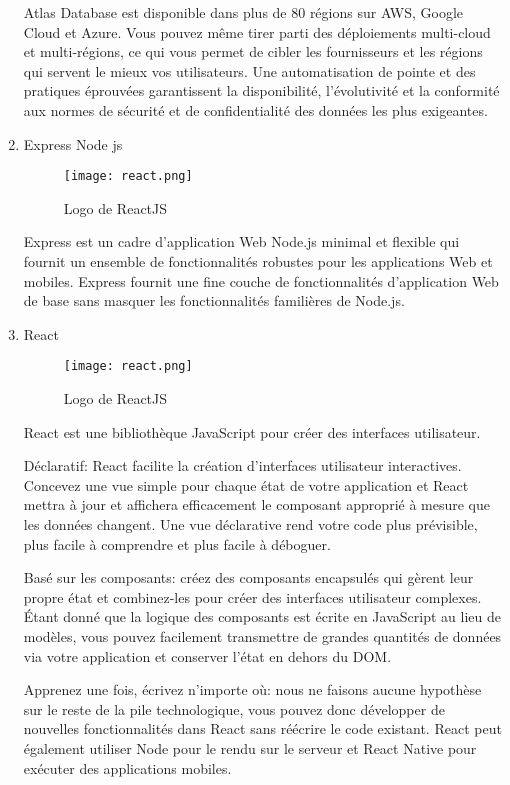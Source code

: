 \begin{enumerate}
        Atlas Database est disponible dans plus de 80 régions sur AWS, Google Cloud et Azure. Vous pouvez même tirer parti des déploiements multi-cloud et multi-régions, ce qui vous permet de cibler les fournisseurs et les régions qui servent le mieux vos utilisateurs. Une automatisation de pointe et des pratiques éprouvées garantissent la disponibilité, l'évolutivité et la conformité aux normes de sécurité et de confidentialité des données les plus exigeantes.
        \bfseries
        \item Express Node js\newline
        \begin{figure}[H]
            \centering
            \texttt{[image: react.png]}
            \caption{Logo de ReactJS}\label{fig:react}
        \end{figure}
        \normalfont
        Express est un cadre d'application Web Node.js minimal et flexible qui fournit un ensemble  de fonctionnalités robustes pour les applications Web et mobiles. 
        Express fournit une fine couche de fonctionnalités d'application Web de base sans masquer les fonctionnalités familières de Node.js.
        \bfseries
        \item React\newline
        \begin{figure}[H]
            \centering
            \texttt{[image: react.png]}
            \caption{Logo de ReactJS}\label{fig:react}
        \end{figure}
        \normalfont
        React est une bibliothèque JavaScript pour créer des interfaces utilisateur. 

        Déclaratif: React facilite la création d'interfaces utilisateur interactives. Concevez une vue simple pour chaque état de votre application et React mettra à jour et affichera efficacement le composant approprié à mesure que les  données changent. Une vue déclarative rend votre code plus prévisible, plus facile à comprendre et plus facile à déboguer. 
 
        Basé sur les composants: créez des composants encapsulés qui gèrent leur propre état et combinez-les pour créer des interfaces utilisateur complexes. Étant donné que la logique des composants est écrite en JavaScript au lieu de modèles, vous pouvez facilement transmettre de grandes quantités de données  via votre application et conserver l'état en dehors du DOM.
 
        Apprenez une fois, écrivez n'importe où: nous ne faisons aucune hypothèse sur le reste de la pile technologique, vous pouvez donc développer de nouvelles fonctionnalités dans React sans réécrire le code existant. React peut également utiliser Node pour le rendu sur le serveur  et React Native pour exécuter des applications mobiles.

        \bfseries
    \end{enumerate}
